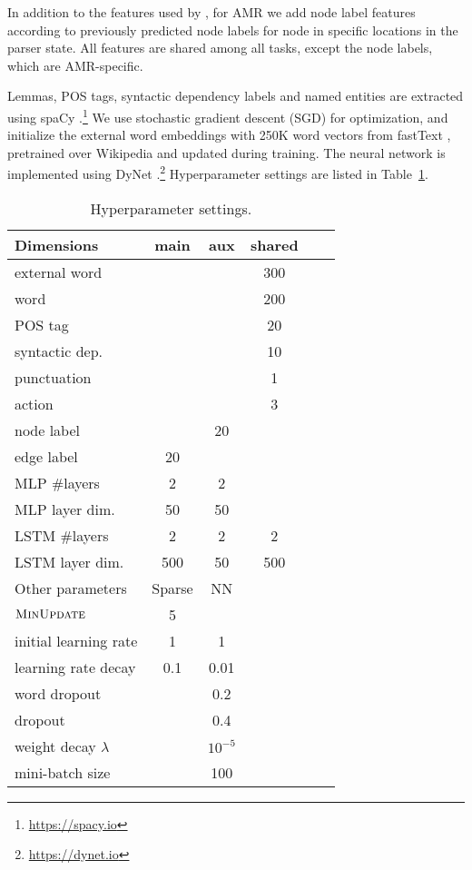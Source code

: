 \documentclass[11pt,a4paper]{article}
\begin{document}
In addition to the features used by \citet{hershcovich2017a},
for AMR we add node label features according to
previously predicted node labels for node in specific locations in the parser state.
All features are shared among all tasks, except the node labels, which are
AMR-specific.

Lemmas, POS tags, syntactic dependency labels and named entities are extracted using spaCy
\cite{spacy2}.\footnote{\url{https://spacy.io}}
We use stochastic gradient descent (SGD) for optimization,
and initialize the external word embeddings with 250K word vectors from fastText
\cite{bojanowski2016enriching}, pretrained over Wikipedia and updated during training.
The neural network is implemented using DyNet \cite{neubig2017dynet}.\footnote{\url{https://dynet.io}}
Hyperparameter settings are listed in Table~\ref{tab:hyperparams}.

\begin{table}
\begin{tabular}{l|ccccc}
\hline
\footnotesize Dimensions &  main & aux & shared \\
\hline
external word & & & 300 \\
word & & & 200 \\
POS tag & & & 20 \\
syntactic dep. & & & 10 \\
punctuation & & & 1 \\
action & & & 3 \\
node label & & 20 \\
edge label & 20 \\
MLP \#layers & 2 & 2 \\
MLP layer dim. & 50 & 50 \\
LSTM \#layers & 2 & 2 & 2 \\
LSTM layer dim. & 500 & 50 & 500 \\
\hline\hline
\footnotesize Other parameters & Sparse & NN \\
\hline
$\textsc{MinUpdate}$ & 5 \\
initial learning rate & 1 & 1 \\
learning rate decay & 0.1 & 0.01 \\
word dropout & & 0.2 \\
dropout & & 0.4 \\
weight decay $\lambda$ & & $10^{-5}$ \\
mini-batch size & & 100
\end{tabular}
\caption{Hyperparameter settings.\label{tab:hyperparams}}
\end{table}
\end{document}
